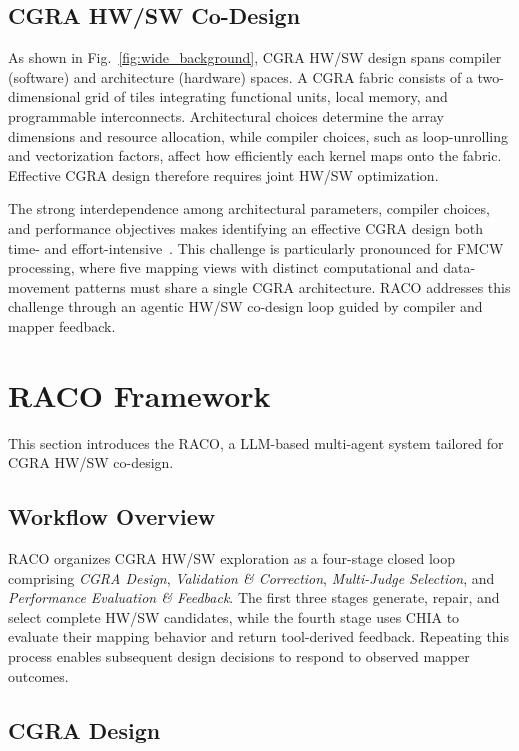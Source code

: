 \documentclass[conference,letterpaper]{IEEEtran}
\begin{document}
\subsection{CGRA HW/SW Co-Design}
As shown in Fig.~\ref{fig:wide_background}, CGRA HW/SW design spans compiler (software) and architecture (hardware) spaces. A CGRA fabric consists of a two-dimensional grid of tiles integrating functional units, local memory, and programmable interconnects. Architectural choices determine the array dimensions and resource allocation, while compiler choices, such as loop-unrolling and vectorization factors, affect how efficiently each kernel maps onto the fabric. Effective CGRA design therefore requires joint HW/SW optimization.

The strong interdependence among architectural parameters, compiler choices, and performance objectives makes identifying an effective CGRA design both time- and effort-intensive~\cite{weng2019daegen,weng2020dsagen}. This challenge is particularly pronounced for FMCW processing, where five mapping views with distinct computational and data-movement patterns must share a single CGRA architecture. RACO addresses this challenge through an agentic HW/SW co-design loop guided by compiler and mapper feedback.

\section{RACO Framework}
This section introduces the RACO, a LLM-based multi-agent system tailored for CGRA HW/SW co-design.
\subsection{Workflow Overview}


RACO organizes CGRA HW/SW exploration as a four-stage closed loop comprising \textit{CGRA Design}, \textit{Validation \& Correction}, \textit{Multi-Judge Selection}, and \textit{Performance Evaluation \& Feedback}. The first three stages generate, repair, and select complete HW/SW candidates, while the fourth stage uses CHIA to evaluate their mapping behavior and return tool-derived feedback. Repeating this process enables subsequent design decisions to respond to observed mapper outcomes.

\subsection{CGRA Design}
\end{document}
